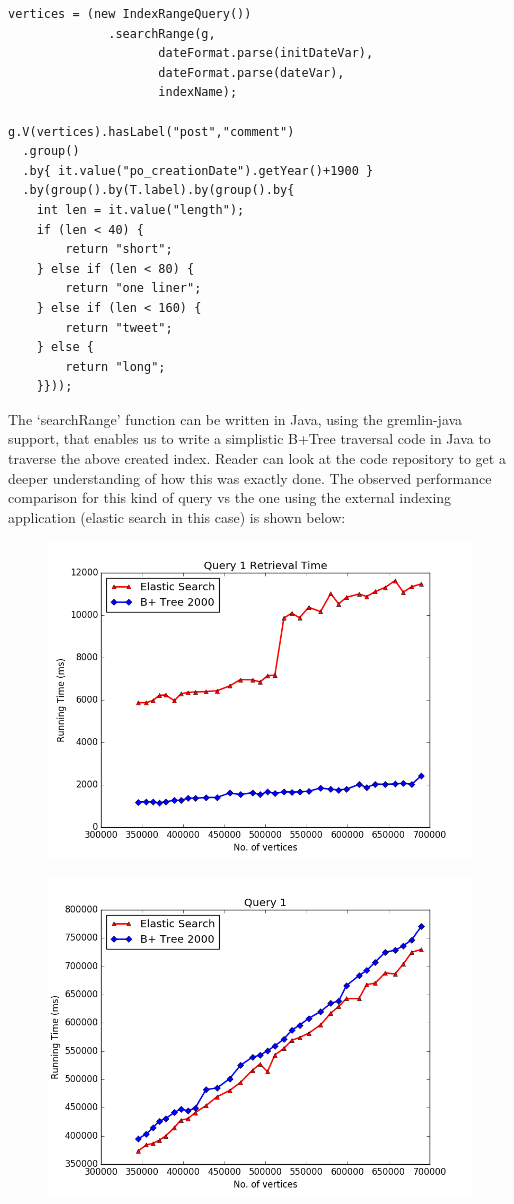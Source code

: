 \begin{lstlisting}
vertices = (new IndexRangeQuery())
              .searchRange(g, 
                     dateFormat.parse(initDateVar),
                     dateFormat.parse(dateVar),
                     indexName);

g.V(vertices).hasLabel("post","comment")
  .group()
  .by{ it.value("po_creationDate").getYear()+1900 }
  .by(group().by(T.label).by(group().by{
    int len = it.value("length");
    if (len < 40) {
        return "short";
    } else if (len < 80) {
        return "one liner";
    } else if (len < 160) {
        return "tweet";
    } else {
        return "long";
    }}));
\end{lstlisting}
The `searchRange' function can be written in Java, using the gremlin-java support, that enables us to write a simplistic B+Tree traversal code in Java to traverse the above created index. Reader can look at the code repository to get a deeper understanding of how this was exactly done. The observed performance comparison for this kind of query vs the one using the external indexing application (elastic search in this case) is shown below:
$\:$\\
\begin{figure}[H]
\centering
\begin{minipage}{0.5\textwidth}
  \centering
  \includegraphics[width=.8\linewidth]{Figures/figure_2}
  \label{fig:test1}
\end{minipage}%
\begin{minipage}{.5\textwidth}
  \centering
  \includegraphics[width=.8\linewidth]{Figures/figure_1}
  \label{fig:test2}
\end{minipage}
\end{figure}
